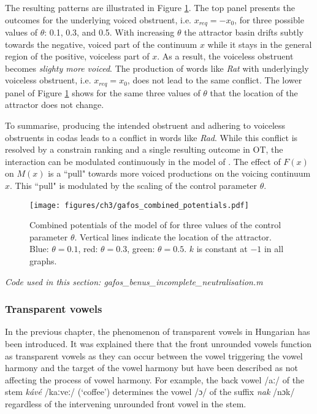 The resulting patterns are illustrated in Figure \ref{fig:gafos_benus_combined_potentials}. The top panel presents the outcomes for the underlying voiced obstruent, i.e. $x_{req} = -x_0$, for three possible values of $\theta$: 0.1, 0.3, and 0.5. With increasing $\theta$ the attractor basin drifts subtly towards the negative, voiced part of the continuum $x$ while it stays in the general region of the positive, voiceless part of $x$. As a result, the voiceless obstruent becomes \emph{slighty more voiced}. The production of words like \emph{Rat} with underlyingly voiceless obstruent, i.e. $x_{req} = x_0$, does not lead to the same conflict. The lower panel of Figure \ref{fig:gafos_benus_combined_potentials} shows for the same three values of $\theta$ that the location of the attractor does not change. 

To summarise, producing the intended obstruent and adhering to voiceless obstruents in codas leads to a conflict in words like \emph{Rad}. While this conflict is resolved by a constrain ranking and a single resulting outcome in OT, the interaction can be modulated continuously in the model of \citet{GafosBenus2006}. The effect of $F(x)$ on $M(x)$ is a ``pull" towards more voiced productions on the voicing continuum $x$. This ``pull" is modulated by the scaling of the control parameter $\theta$. 

\begin{figure}[t]
\texttt{[image: figures/ch3/gafos\_combined\_potentials.pdf]}
\caption[Combined potentials of the model of \citet{GafosBenus2006}.]{Combined potentials of the model of \citet{GafosBenus2006} for three values of the control parameter $\theta$. Vertical lines indicate the location of the attractor. Blue: $\theta = 0.1$, red: $\theta = 0.3$, green: $\theta = 0.5$. $k$ is constant at $-1$ in all graphs.}
\label{fig:gafos_benus_combined_potentials}
\end{figure}

\medskip\noindent \textit{Code used in this section: gafos\_benus\_incomplete\_neutralisation.m}

\subsubsection{Transparent vowels}

In the previous chapter, the phenomenon of transparent vowels in Hungarian has been introduced. It was explained there that the front unrounded vowels function as transparent vowels as they can occur between the vowel triggering the vowel harmony and the target of the vowel harmony but have been described as not affecting the process of vowel harmony. For example, the back vowel /aː/ of the stem \emph{kávé} /kaːveː/ (`coffee') determines the vowel /ɔ/ of the suffix \emph{nak} /nɔk/ regardless of the intervening unrounded front vowel in the stem. 

